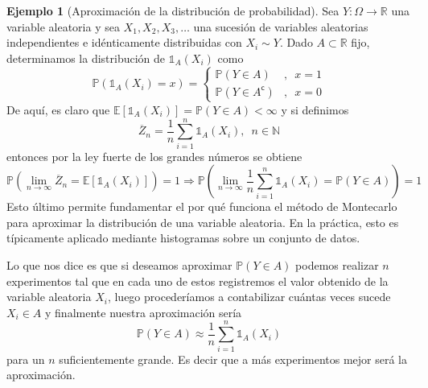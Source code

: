 \documentclass[11pt,a4paper]{book}
\theoremstyle{definition}%
\newtheorem{ejemplo}[teorema]{Ejemplo}
\newcommand{\setcomplement}{\mathsf{c}}
\newcommand{\Natural}{\mathbb{N}}
\newcommand{\EV}[1]{\mathbb{E}\left[#1\right]}
\newcommand{\Prob}[1]{\mathds{P}\left( #1 \right)}
\begin{document}
            \begin{ejemplo}[Aproximación de la distribución de probabilidad]\label{montecarlo dist prob}
                Sea $Y:\Omega\longrightarrow\mathbb{R}$ una variable aleatoria y sea $X_1,X_2,X_3,\ldots$ una sucesión de variables aleatorias independientes e idénticamente distribuidas con $X_i \sim Y$. Dado $A\subset \mathbb{R}$ fijo, determinamos la distribución de $\mathds{1}_A (X_i)$ como
                \begin{equation*}
                    \Prob{\mathds{1}_A (X_i) = x} = \left\{ \begin{array}{cl}
                         \Prob{Y \in A}&,\enspace x=1  \\
                         \Prob{Y \in A^\setcomplement}&,\enspace x=0
                    \end{array}\right.
                \end{equation*}
                De aquí, es claro que $\EV{\mathds{1}_A (X_i)}=\Prob{Y \in A}<\infty$ y si definimos
                \begin{equation*}
                    \overline{Z}_n = \frac{1}{n}\sum_{i=1}^n \mathds{1}_A (X_i),\enspace n \in\Natural
                \end{equation*}
                entonces por la ley fuerte de los grandes números se obtiene
                \begin{equation*}
                    \Prob{ \lim_{n \to \infty} \overline{Z}_{n} = \EV{\mathds{1}_A (X_i)}}= 1 \Longrightarrow \Prob{ \lim_{n \to \infty} \frac{1}{n}\sum_{i=1}^n \mathds{1}_A (X_i) = \Prob{Y \in A}}= 1
                \end{equation*}
                Esto último permite fundamentar el por qué funciona el método de Montecarlo para aproximar la distribución de una variable aleatoria. En la práctica, esto es típicamente aplicado mediante histogramas sobre un conjunto de datos.
                
                Lo que nos dice es que si deseamos aproximar $\Prob{Y \in A}$ podemos realizar $n$ experimentos tal que en cada uno de estos registremos el valor obtenido de la variable aleatoria $X_i$, luego procederíamos a contabilizar cuántas veces sucede $X_i\in A$ y finalmente nuestra aproximación sería 
                \begin{equation}\label{approx dist va montecarlo}
                    \Prob{Y \in A} \approx \frac{1}{n}\sum_{i=1}^n \mathds{1}_A (X_i)
                \end{equation}
                para un $n$ suficientemente grande. Es decir que a más experimentos mejor será la aproximación.
            \end{ejemplo}
\end{document}
